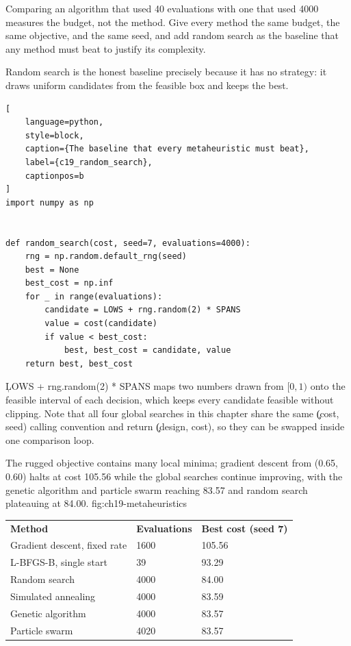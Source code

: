 
Comparing an algorithm that used 40 evaluations with one that used 4000 measures
the budget, not the method. Give every method the same budget, the same
objective, and the same seed, and add random search as the baseline that any
method must beat to justify its complexity.

Random search is the honest baseline precisely because it has no strategy: it
draws uniform candidates from the feasible box and keeps the best.

\begin{lstlisting}[
    language=python,
    style=block,
    caption={The baseline that every metaheuristic must beat},
    label={c19_random_search},
    captionpos=b
]
import numpy as np


def random_search(cost, seed=7, evaluations=4000):
    rng = np.random.default_rng(seed)
    best = None
    best_cost = np.inf
    for _ in range(evaluations):
        candidate = LOWS + rng.random(2) * SPANS
        value = cost(candidate)
        if value < best_cost:
            best, best_cost = candidate, value
    return best, best_cost
\end{lstlisting}

\c{LOWS + rng.random(2) * SPANS} maps two numbers drawn from $[0, 1)$ onto the
feasible interval of each decision, which keeps every candidate feasible without
clipping. Note that all four global searches in this chapter share the same
\c{(cost, seed)} calling convention and return \c{(design, cost)}, so they can be
swapped inside one comparison loop.

{The rugged objective contains many local minima; gradient descent from (0.65, 0.60) halts at cost 105.56 while the global searches continue improving, with the genetic algorithm and particle swarm reaching 83.57 and random search plateauing at 84.00.}
{fig:ch19-metaheuristics}

\begin{center}
\begin{tabular}{lll}
\textbf{Method} & \textbf{Evaluations} & \textbf{Best cost (seed 7)} \\
Gradient descent, fixed rate & 1600 & 105.56 \\
L-BFGS-B, single start & 39 & 93.29 \\
Random search & 4000 & 84.00 \\
Simulated annealing & 4000 & 83.59 \\
Genetic algorithm & 4000 & 83.57 \\
Particle swarm & 4020 & 83.57 \\
\end{tabular}
\end{center}

